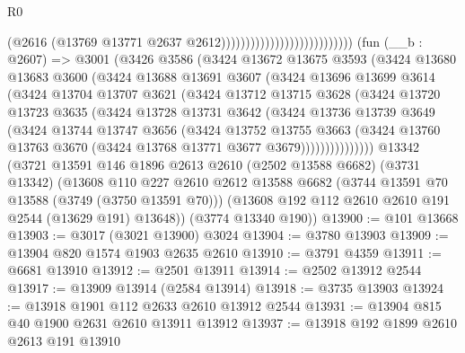 \begin{lexlean}{R0}
\begin{coremodule}
                                                      (@2616
                                                        (@13769
                                                          @13771
                                                          @2637
                                                          @2612)))))))))))))))))))))))))))
    (fun (__b : @2607) =>
    @3001
      (@3426
        @3586
        (@3424
          @13672
          @13675
          @3593
          (@3424
            @13680
            @13683
            @3600
            (@3424
              @13688
              @13691
              @3607
              (@3424
                @13696
                @13699
                @3614
                (@3424
                  @13704
                  @13707
                  @3621
                  (@3424
                    @13712
                    @13715
                    @3628
                    (@3424
                      @13720
                      @13723
                      @3635
                      (@3424
                        @13728
                        @13731
                        @3642
                        (@3424
                          @13736
                          @13739
                          @3649
                          (@3424
                            @13744
                            @13747
                            @3656
                            (@3424
                              @13752
                              @13755
                              @3663
                              (@3424
                                @13760
                                @13763
                                @3670
                                (@3424 @13768 @13771 @3677 @3679)))))))))))))))
    @13342
    (@3721
      @13591
      @146
      @1896
      @2613
      @2610
      (@2502 @13588 @6682)
      (@3731 @13342)
      (@13608
        @110
        @227
        @2610
        @2612
        @13588
        @6682
        (@3744 @13591 @70 @13588 (@3749 (@3750 @13591 @70)))
        (@13608 @192 @112 @2610 @2610 @191 @2544 (@13629 @191) @13648))
      (@3774 @13340 @190))
@13900 := @101 @13668
@13903 := @3017 (@3021 @13900) @3024
@13904 := @3780 @13903
@13909 := @13904 @820 @1574 @1903 @2635 @2610
@13910 := @3791 @4359
@13911 := @6681 @13910
@13912 := @2501 @13911
@13914 := @2502 @13912 @2544
@13917 := @13909 @13914 (@2584 @13914)
@13918 := @3735 @13903
@13924 := @13918 @1901 @112 @2633 @2610 @13912 @2544
@13931 := @13904 @815 @40 @1900 @2631 @2610 @13911 @13912
@13937 := @13918 @192 @1899 @2610 @2613 @191 @13910

\end{coremodule}
\end{lexlean}
